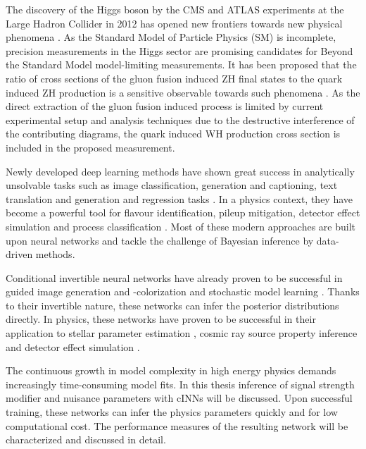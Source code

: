 \label{sec:introduction}

The discovery of the Higgs boson by the CMS and ATLAS experiments at the Large Hadron Collider in 2012 has opened new frontiers towards new physical phenomena \cite{Chatrchyan_2012}. As the Standard Model of Particle Physics (SM) is incomplete, precision measurements in the Higgs sector are promising candidates for Beyond the Standard Model model-limiting measurements. It has been proposed that the ratio of cross sections of the gluon fusion induced ZH final states to the quark induced ZH production is a sensitive observable towards such phenomena \cite{Harlander_2018}. As the direct extraction of the gluon fusion induced process is limited by current experimental setup and analysis techniques due to the destructive interference of the contributing diagrams, the quark induced WH production cross section is included in the proposed measurement.

Newly developed deep learning methods have shown great success in analytically unsolvable tasks such as image classification, generation and captioning, text translation and generation and regression tasks \cite{LeCun2015}. In a physics context, they have become a powerful tool for flavour identification, pileup mitigation, detector effect simulation and process classification \cite{Schwartz_2021}. Most of these modern approaches are built upon neural networks and tackle the challenge of Bayesian inference by data-driven methods.

Conditional invertible neural networks have already proven to be successful in guided image generation and -colorization \cite{cINN_im_gen} and stochastic model learning \cite{BayesFlow}. Thanks to their invertible nature, these networks can infer the posterior distributions directly. In physics, these networks have proven to be successful in their application to stellar parameter estimation \cite{Ksoll_2020}, cosmic ray source property inference \cite{Bister_2022} and detector effect simulation \cite{Bellagente_2020}.

The continuous growth in model complexity in high energy physics demands increasingly time-consuming model fits. In this thesis inference of signal strength modifier and nuisance parameters with cINNs will be discussed. Upon successful training, these networks can infer the physics parameters quickly and for low computational cost. The performance measures of the resulting network will be characterized and discussed in detail.